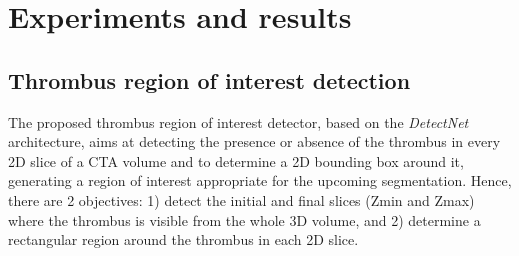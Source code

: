 \documentclass[preprint,authoryear,12pt]{elsarticle}
\begin{document}
\section{Experiments and results}
\label{sec:results}

\subsection{Thrombus region of interest detection}

The proposed thrombus region of interest detector, based on the \textit{DetectNet} architecture, aims at detecting the presence or absence of the thrombus in every 2D slice of a CTA volume and to determine a 2D bounding box around it, generating a region of interest appropriate for the upcoming segmentation. Hence, there are 2 objectives: 1) detect the initial and final slices (Zmin and Zmax) where the thrombus is visible from the whole 3D volume, and 2) determine a rectangular region around the thrombus in each 2D slice. \par
\end{document}
